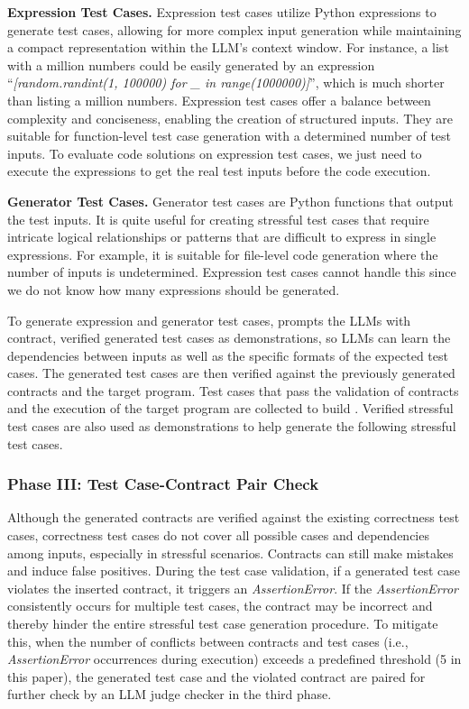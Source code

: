 \textbf{Expression Test Cases.} Expression test cases utilize Python expressions to generate test cases, allowing for more complex input generation while maintaining a compact representation within the LLM's context window. For instance, a list with a million numbers could be easily generated by an expression ``\textit{[random.randint(1, 100000) for \_ in range(1000000)]}'', which is much shorter than listing a million numbers. Expression test cases offer a balance between complexity and conciseness, enabling the creation of structured inputs. They are suitable for function-level test case generation with a determined number of test inputs. To evaluate code solutions on expression test cases, we just need to execute the expressions to get the real test inputs before the code execution. 



\textbf{Generator Test Cases.} Generator test cases are Python functions that output the test inputs. It is quite useful for creating stressful test cases that require intricate logical relationships or patterns that are difficult to express in single expressions. For example, it is suitable for file-level code generation where the number of inputs is undetermined. Expression test cases cannot handle this since we do not know how many expressions should be generated.

To generate expression and generator test cases, \tool prompts the LLMs with contract, verified generated test cases as demonstrations, so LLMs can learn the dependencies between inputs as well as the specific formats of the expected test cases. The generated test cases are then verified against the previously generated contracts and the target program. Test cases that pass the validation of contracts and the execution of the target program are collected to build \bench. Verified stressful test cases are also used as demonstrations to help generate the following stressful test cases.

\subsubsection{Phase III: Test Case-Contract Pair Check}

Although the generated contracts are verified against the existing correctness test cases, correctness test cases do not cover all possible cases and dependencies among inputs, especially in stressful scenarios. Contracts can still make mistakes and induce false positives. During the test case validation, if a generated test case violates the inserted contract, it triggers an \textit{AssertionError}. If the \textit{AssertionError} consistently occurs for multiple test cases, the contract may be incorrect and thereby hinder the entire stressful test case generation procedure. To mitigate this, when the number of conflicts between contracts and test cases (i.e., \textit{AssertionError} occurrences during execution) exceeds a predefined threshold (5 in this paper), the generated test case and the violated contract are paired for further check by an LLM judge checker in the third phase.


